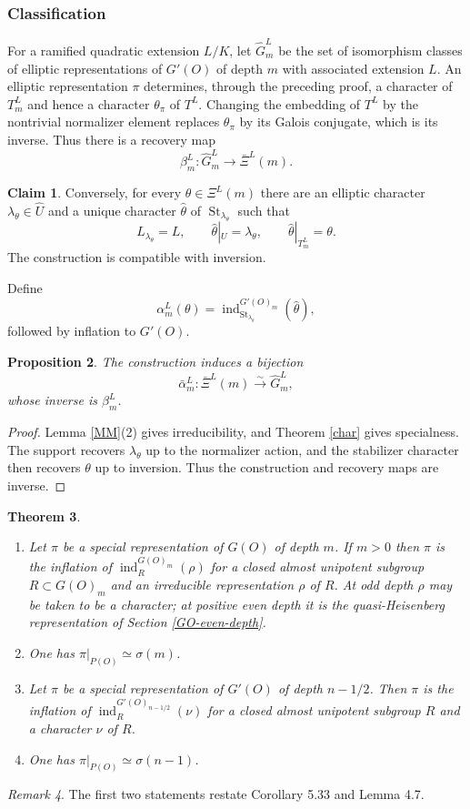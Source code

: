 \documentclass[11pt,a4paper,twoside]{amsart}
\newtheorem{theorem}{Theorem}[section]
\newtheorem{proposition}[theorem]{Proposition}
\theoremstyle{definition}
\newtheorem{claim}[theorem]{Claim}
\theoremstyle{remark}
\newtheorem{remark}[theorem]{Remark}
\newcommand{\bl}{\lambda}
\newcommand{\bs}{\sigma}
\newcommand{\ind}{\operatorname{ind}}
\newcommand{\St}{\operatorname{St}}
\begin{document}
\subsubsection{Classification}
For a ramified quadratic extension $L/K$, let $\widehat G_m^L$ be the set of isomorphism classes of elliptic representations of $G'(O)$ of depth $m$ with associated extension $L$.
An elliptic representation $\pi$ determines, through the preceding proof, a character of $T^L_m$ and hence a character $\theta_\pi$ of $T^L$. Changing the embedding of $T^L$ by the nontrivial normalizer element replaces $\theta_\pi$ by its Galois conjugate, which is its inverse. Thus there is a recovery map
$$
\beta_m^L:\widehat G_m^L\longrightarrow\bar\Xi^L(m).
$$
\begin{claim}\label{Gprime-parameter}
Conversely, for every $\theta\in\Xi^L(m)$ there are an elliptic character $\bl_\theta\in\widehat U$ and a unique character $\widehat\theta$ of $\St_{\bl_\theta}$ such that
$$
L_{\bl_\theta}=L,
\qquad
\widehat\theta|_U=\bl_\theta,
\qquad
\widehat\theta|_{T^L_m}=\theta.
$$
The construction is compatible with inversion.
\end{claim}
Define
$$
\alpha_m^L(\theta)=\ind_{\St_{\bl_\theta}}^{G'(O)_m}(\widehat\theta),
$$
followed by inflation to $G'(O)$.
\begin{proposition}\label{Oodd}
The construction induces a bijection
$$
\bar\alpha_m^L:\bar\Xi^L(m)\stackrel{\sim}{\longrightarrow}\widehat G_m^L,
$$
whose inverse is $\beta_m^L$.
\end{proposition}
\begin{proof}
Lemma \ref{MM}(2) gives irreducibility, and Theorem \ref{char} gives specialness. The support recovers $\bl_\theta$ up to the normalizer action, and the stabilizer character then recovers $\theta$ up to inversion. Thus the construction and recovery maps are inverse.
\end{proof}
\begin{theorem}\label{cunr-summary}
\begin{enumerate}
\item Let $\pi$ be a special representation of $G(O)$ of depth $m$. If $m>0$ then $\pi$ is the inflation of $\ind_R^{G(O)_m}(\rho)$ for a closed almost unipotent subgroup $R\subset G(O)_m$ and an irreducible representation $\rho$ of $R$. At odd depth $\rho$ may be taken to be a character; at positive even depth it is the quasi-Heisenberg representation of Section \ref{GO-even-depth}.
\item One has $\pi|_{P(O)}\simeq\bs(m)$.
\item Let $\pi$ be a special representation of $G'(O)$ of depth $n-1/2$. Then $\pi$ is the inflation of $\ind_R^{G'(O)_{n-1/2}}(\nu)$ for a closed almost unipotent subgroup $R$ and a character $\nu$ of $R$.
\item One has $\pi|_{P(O)}\simeq\bs(n-1)$.
\end{enumerate}
\end{theorem}
\begin{remark}The first two statements restate Corollary 5.33 and Lemma 4.7.\end{remark}
\end{document}
